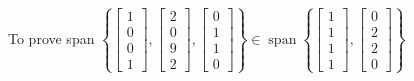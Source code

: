 \documentclass[11pt]{article}
\begin{document}
\begin{enumerate}[{\bf Q1.}]
\begin{enumerate}
			To prove span $\left\{\left[\begin{array}{l}1 \\ 0 \\ 0 \\ 1\end{array}\right],\left[\begin{array}{l}2 \\ 0 \\ 9 \\ 2\end{array}\right],\left[\begin{array}{l}0 \\ 1 \\ 1 \\ 0\end{array}\right]\right\} \in \operatorname{span}\left\{\left[\begin{array}{l}1 \\ 1 \\ 1 \\ 1\end{array}\right],\left[\begin{array}{l}0 \\ 2 \\ 2 \\ 0\end{array}\right]\right\}$
			

\end{enumerate}
\end{enumerate}
\end{document}
